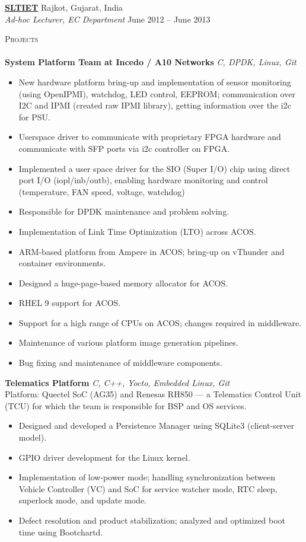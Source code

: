\documentclass[a4paper]{article}
\newcommand{\lineunder} {
    \vspace*{-8pt} \\
    \hspace*{-18pt} \hrulefill \\
}
\newcommand{\header} [1] {
    {\hspace*{-18pt}\vspace*{6pt} \textsc{#1}}
    \vspace*{-6pt} \lineunder
}
\begin{document}
\textbf{\href{https://www.sltiet.edu.in/}{SLTIET}} \hfill Rajkot, Gujarat, India\\
\textit{Ad-hoc Lecturer, EC Department} \hfill June 2012 -- June 2013\\
\vspace{2mm}

\header{Projects}
{\textbf{System Platform Team at Incedo / A10 Networks}} {\sl C, DPDK, Linux, Git} \\
\begin{itemize} \itemsep 0.5pt
	\item New hardware platform bring-up and implementation of sensor monitoring (using OpenIPMI), watchdog, LED control, EEPROM; communication over I2C and IPMI (created raw IPMI library), getting information over the i2c for PSU.
	\item Userspace driver to communicate with proprietary FPGA hardware and communicate with SFP ports via i2c controller on FPGA. 
	\item Implemented a user space driver for the SIO (Super I/O) chip using direct port I/O (iopl/inb/outb), enabling hardware monitoring and control (temperature, FAN speed, voltage, watchdog)
	\item Responsible for DPDK maintenance and problem solving.
	\item Implementation of Link Time Optimization (LTO) across ACOS.
	\item ARM-based platform from Ampere in ACOS; bring-up on vThunder and container environments.
	\item Designed a huge-page-based memory allocator for ACOS.
	\item RHEL 9 support for ACOS.
	\item Support for a high range of CPUs on ACOS; changes required in middleware.
	\item Maintenance of various platform image generation pipelines.
	\item Bug fixing and maintenance of middleware components.
\end{itemize}
\vspace*{2mm}

{\textbf{Telematics Platform}} {\sl C, C++, Yocto, Embedded Linux, Git} \\
Platform: Quectel SoC (AG35) and Renesas RH850 — a Telematics Control Unit (TCU) for which the team is responsible for BSP and OS services.\\
\begin{itemize} \itemsep 0.5pt
\item Designed and developed a Persistence Manager using SQLite3 (client-server model).
\item GPIO driver development for the Linux kernel.
\item Implementation of low-power mode; handling synchronization between Vehicle Controller (VC) and SoC for service watcher mode, RTC sleep, superlock mode, and update mode.
\item Defect resolution and product stabilization; analyzed and optimized boot time using Bootchartd.
\end{itemize}
\vspace*{2mm}
\end{document}
